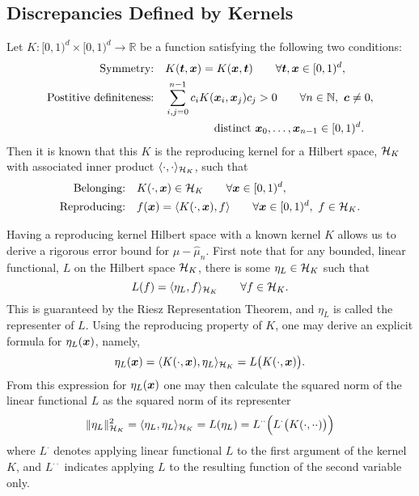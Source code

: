\documentclass{svproc}
\begin{document}
\subsection{Discrepancies Defined by Kernels} \label{sec:kerdisc}
Let $K: [0,1)^d \times [0,1)^d \to \mathbb{R}$ be a function satisfying the following two conditions:
\begin{subequations} \label{eq:Kcond}
	\begin{align}
		\label{eq:KcondSym}
		\text{Symmetry:} \quad & K({\boldsymbol{t}},{\boldsymbol{x}}) = K({\boldsymbol{x}},{\boldsymbol{t}}) \qquad \forall {\boldsymbol{t}},{\boldsymbol{x}} \in [0,1)^d, \\
		\nonumber
		\text{Postitive definiteness:} \quad & \sum_{i,j = 0}^{n-1} c_i K({\boldsymbol{x}}_i,{\boldsymbol{x}}_j) c_j > 0 \qquad  \forall n \in \mathbb{N}, \ {\boldsymbol{c}} \ne 0, \\
		& \qquad \qquad  \ \text{distinct } {\boldsymbol{x}}_0, \ldots, {\boldsymbol{x}}_{n-1} \in [0,1)^d. \label{eq:KcondPD}
	\end{align}
\end{subequations}
Then it is known \cite{Aro50} that this $K$ is the reproducing kernel for a Hilbert space, ${\mathcal{H}}_K$ with associated inner product $\langle \cdot, \cdot \rangle_{{\mathcal{H}}_K}$, such that
\begin{subequations}
	\begin{align}
	\text{Belonging:} \quad & K(\cdot,{\boldsymbol{x}}) \in {\mathcal{H}}_K \qquad \forall {\boldsymbol{x}} \in [0,1)^d, \\
	\text{Reproducing:} \quad & f({\boldsymbol{x}}) = \langle K(\cdot,{\boldsymbol{x}}),f \rangle \qquad  \forall {\boldsymbol{x}} \in [0,1)^d, \ f \in {\mathcal{H}}_K.
\end{align}
\end{subequations}

Having a reproducing kernel Hilbert space with a known kernel $K$ allows us to derive a rigorous error bound for $\mu - \hat{\mu}_n$.  First note that for any bounded, linear functional, $L$ on the Hilbert space ${\mathcal{H}}_K$, there is some $\eta_L \in {\mathcal{H}}_K$ such that
\begin{equation*}
L(f) = \langle \eta_L , f \rangle_{{\mathcal{H}}_K} \qquad \forall f \in {\mathcal{H}}_K.
\end{equation*}
This is guaranteed by the Riesz Representation Theorem, and $\eta_L$ is called the representer of $L$.  Using the reproducing property of $K$, one may derive an explicit formula for $\eta_L({\boldsymbol{x}})$, namely,
\begin{equation*}
\eta_L({\boldsymbol{x}}) = \langle K(\cdot, {\boldsymbol{x}}), \eta_L \rangle_{{\mathcal{H}}_K} = L\bigl( K(\cdot,{\boldsymbol{x}}) \bigr).
\end{equation*}
From this expression for $\eta_L({\boldsymbol{x}})$ one may then calculate the squared norm of the linear functional $L$ as the squared norm of its representer
\begin{equation} \label{eq:sqnormL}
	\lVert \eta_L \rVert_{{\mathcal{H}}_K}^2 = \langle\eta_L, \eta_L \rangle_{{\mathcal{H}}_K} = L(\eta_L) = L^{\cdot\cdot} \Bigl(L^{\cdot}\bigl( K(\cdot,\cdot \cdot) \bigr) \Bigr)
\end{equation}
where $L^\cdot$ denotes applying linear functional $L$ to the first argument of the kernel $K$, and $L^{\cdot\cdot}$ indicates applying $L$ to the resulting function of the second variable only. 
\end{document}
